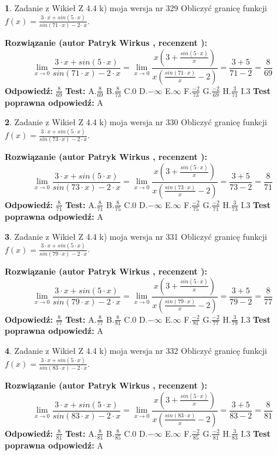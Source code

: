 \documentclass[12pt, a4paper]{article}
\theoremstyle{definition} %
\newtheorem{zad}{}
\newcommand{\zadStart}[1]{\begin{zad}#1\newline}
\newcommand{\zadStop}{\end{zad}}
\newcommand{\rozwStart}[2]{\noindent \textbf{Rozwiązanie (autor #1 , recenzent #2): }\newline}
\newcommand{\rozwStop}{\newline}
\newcommand{\odpStart}{\noindent \textbf{Odpowiedź:}\newline}
\newcommand{\odpStop}{\newline}
\newcommand{\testStart}{\noindent \textbf{Test:}\newline}
\newcommand{\testStop}{\newline}
\newcommand{\kluczStart}{\noindent \textbf{Test poprawna odpowiedź:}\newline}
\newcommand{\kluczStop}{\newline}
\begin{document}
\zadStart{Zadanie z Wikieł Z 4.4 k) moja wersja nr 329}
Obliczyć granicę funkcji $f(x)=\frac{3\cdot x +sin(5\cdot x)}{sin(71\cdot x) -2\cdot x}$.
\zadStop
\rozwStart{Patryk Wirkus}{}
$$\lim\limits_{x\to 0}\frac{3\cdot x +sin(5\cdot x)}{sin(71\cdot x) -2\cdot x}
=\lim\limits_{x\to 0}\frac{x(3+\frac{sin(5\cdot x)}{x})}{x(\frac{sin(71\cdot x)}{x}-2)}
=\frac{3+5}{71-2} = \frac{8}{69}$$
\rozwStop
\odpStart
$\frac{8}{69}$
\odpStop
\testStart
A.$\frac{8}{69}$
B.$\frac{8}{73}$
C.$0$
D.$-\infty$
E.$\infty$
F.$\frac{-2}{73}$
G.$\frac{-2}{69}$
H.$\frac{3}{71}$
I.$3$
\testStop
\kluczStart
A
\kluczStop



\zadStart{Zadanie z Wikieł Z 4.4 k) moja wersja nr 330}
Obliczyć granicę funkcji $f(x)=\frac{3\cdot x +sin(5\cdot x)}{sin(73\cdot x) -2\cdot x}$.
\zadStop
\rozwStart{Patryk Wirkus}{}
$$\lim\limits_{x\to 0}\frac{3\cdot x +sin(5\cdot x)}{sin(73\cdot x) -2\cdot x}
=\lim\limits_{x\to 0}\frac{x(3+\frac{sin(5\cdot x)}{x})}{x(\frac{sin(73\cdot x)}{x}-2)}
=\frac{3+5}{73-2} = \frac{8}{71}$$
\rozwStop
\odpStart
$\frac{8}{71}$
\odpStop
\testStart
A.$\frac{8}{71}$
B.$\frac{8}{75}$
C.$0$
D.$-\infty$
E.$\infty$
F.$\frac{-2}{75}$
G.$\frac{-2}{71}$
H.$\frac{3}{73}$
I.$3$
\testStop
\kluczStart
A
\kluczStop



\zadStart{Zadanie z Wikieł Z 4.4 k) moja wersja nr 331}
Obliczyć granicę funkcji $f(x)=\frac{3\cdot x +sin(5\cdot x)}{sin(79\cdot x) -2\cdot x}$.
\zadStop
\rozwStart{Patryk Wirkus}{}
$$\lim\limits_{x\to 0}\frac{3\cdot x +sin(5\cdot x)}{sin(79\cdot x) -2\cdot x}
=\lim\limits_{x\to 0}\frac{x(3+\frac{sin(5\cdot x)}{x})}{x(\frac{sin(79\cdot x)}{x}-2)}
=\frac{3+5}{79-2} = \frac{8}{77}$$
\rozwStop
\odpStart
$\frac{8}{77}$
\odpStop
\testStart
A.$\frac{8}{77}$
B.$\frac{8}{81}$
C.$0$
D.$-\infty$
E.$\infty$
F.$\frac{-2}{81}$
G.$\frac{-2}{77}$
H.$\frac{3}{79}$
I.$3$
\testStop
\kluczStart
A
\kluczStop



\zadStart{Zadanie z Wikieł Z 4.4 k) moja wersja nr 332}
Obliczyć granicę funkcji $f(x)=\frac{3\cdot x +sin(5\cdot x)}{sin(83\cdot x) -2\cdot x}$.
\zadStop
\rozwStart{Patryk Wirkus}{}
$$\lim\limits_{x\to 0}\frac{3\cdot x +sin(5\cdot x)}{sin(83\cdot x) -2\cdot x}
=\lim\limits_{x\to 0}\frac{x(3+\frac{sin(5\cdot x)}{x})}{x(\frac{sin(83\cdot x)}{x}-2)}
=\frac{3+5}{83-2} = \frac{8}{81}$$
\rozwStop
\odpStart
$\frac{8}{81}$
\odpStop
\testStart
A.$\frac{8}{81}$
B.$\frac{8}{85}$
C.$0$
D.$-\infty$
E.$\infty$
F.$\frac{-2}{85}$
G.$\frac{-2}{81}$
H.$\frac{3}{83}$
I.$3$
\testStop
\kluczStart
A
\kluczStop
\end{document}
